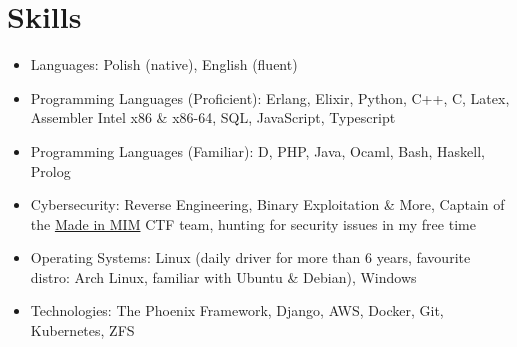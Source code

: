 \section{\sc Skills}
\begin{itemize}[leftmargin=0.16cm]
\setlength\itemsep{0em}
\item Languages: Polish (native), English (fluent)
\item Programming Languages (Proficient): Erlang, Elixir, Python, C++, C, Latex, Assembler Intel x86 \& x86-64, SQL, JavaScript, Typescript
\item Programming Languages (Familiar): D, PHP, Java, Ocaml, Bash, Haskell, Prolog
\item Cybersecurity: Reverse Engineering, Binary Exploitation \& More, Captain of the \href{https://ctftime.org/team/48557}{Made in MIM} CTF team, hunting for security issues in my free time
\item Operating Systems: Linux (daily driver for more than 6 years, favourite distro: Arch Linux, familiar with Ubuntu \& Debian), Windows
\item Technologies: The Phoenix Framework, Django, AWS, Docker, Git, Kubernetes, ZFS
\end{itemize}
